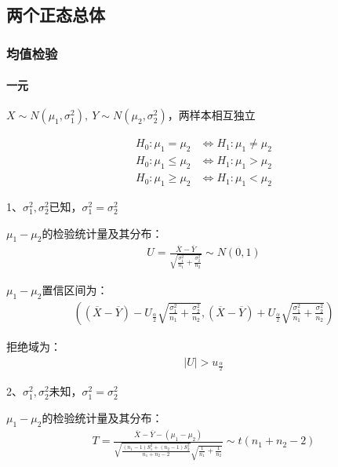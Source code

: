 \documentclass[12pt]{book}
\begin{document}
\subsection{两个正态总体}





\subsubsection{均值检验}

\paragraph{一元}
$X\sim N\left(\mu_1,\sigma_1^2\right),\ Y\sim N\left(\mu_2,\sigma_2^2\right)$，两样本相互独立

\begin{align*}
    H_0: \mu_1=\mu_2    & \Leftrightarrow H_1: \mu_1\neq\mu_2 \\
    H_0: \mu_1\le\mu_2  & \Leftrightarrow H_1: \mu_1>\mu_2    \\
    H_0: \mu_1\geq\mu_2 & \Leftrightarrow H_1: \mu_1<\mu_2
\end{align*}


1、$\sigma_1^2,\sigma_2^2$已知，$\sigma_1^2=\sigma_2^2$

$\mu_{1}-\mu_{2}$的检验统计量及其分布：
\begin{gather*}
    U=\frac{\overline{X}-\overline{Y}}{\sqrt{\frac{\sigma_1^2}{n_1}+\frac{\sigma_2^2}{n_2}}}\sim N(0,1)
\end{gather*}

$\mu_1-\mu_2$置信区间为：
\begin{gather*}
    \left(
        (\overline{X}-\overline{Y})-U_{\frac{\alpha}{2}} \sqrt{\frac{\sigma_1^2}{n_1}+\frac{\sigma_2^2}{n_2}},
        (\overline{X}-\overline{Y})+U_{\frac{\alpha}{2}} \sqrt{\frac{\sigma_1^2}{n_1}+\frac{\sigma_2^2}{n_2}}
    \right)
\end{gather*}


拒绝域为：
\begin{gather*}
    \left|U\right|>u_{\frac{\alpha}{2}}
\end{gather*}


2、$\sigma_1^2,\sigma_2^2$未知，$\sigma_1^2=\sigma_2^2$

$\mu_{1}-\mu_{2}$的检验统计量及其分布：
\begin{gather*}
    T=\frac{\overline{X}-\overline{Y}-(\mu_1-\mu_2)}{\sqrt{\frac{\left(n_1-1\right)S_1^2+\left(n_2-1\right)S_2^2}{n_1+n_2-2}}\sqrt{\frac{1}{n_1}+\frac{1}{n_2}}}\sim t(n_1+n_2-2)
\end{gather*}
\end{document}
